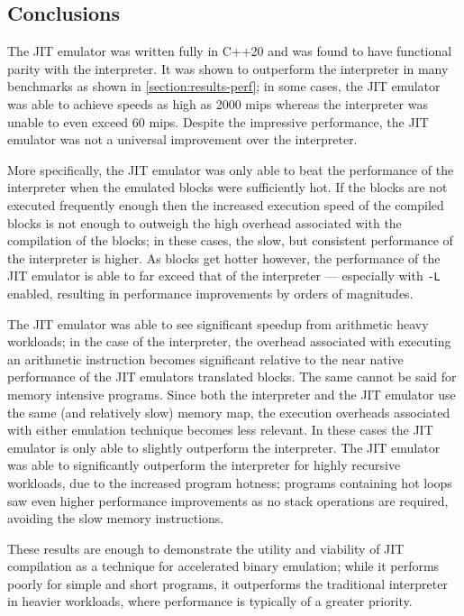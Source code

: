 \subsection{Conclusions}

The JIT emulator was written fully in C++20 and was found to have functional parity with the interpreter. It was shown to outperform the interpreter in many benchmarks as shown in \autoref{section:results-perf}; in some cases, the JIT emulator was able to achieve speeds as high as 2000 mips whereas the interpreter was unable to even exceed 60 mips. Despite the impressive performance, the JIT emulator was not a universal improvement over the interpreter.

More specifically, the JIT emulator was only able to beat the performance of the interpreter when the emulated blocks were sufficiently hot. If the blocks are not executed frequently enough then the increased execution speed of the compiled blocks is not enough to outweigh the high overhead associated with the compilation of the blocks; in these cases, the slow, but consistent performance of the interpreter is higher. As blocks get hotter however, the performance of the JIT emulator is able to far exceed that of the interpreter — especially with \texttt{-L} enabled, resulting in performance improvements by orders of magnitudes.

The JIT emulator was able to see significant speedup from arithmetic heavy workloads; in the case of the interpreter, the overhead associated with executing an arithmetic instruction becomes significant relative to the near native performance of the JIT emulators translated blocks. The same cannot be said for memory intensive programs. Since both the interpreter and the JIT emulator use the same (and relatively slow) memory map, the execution overheads associated with either emulation technique becomes less relevant. In these cases the JIT emulator is only able to slightly outperform the interpreter. The JIT emulator was able to significantly outperform the interpreter for highly recursive workloads, due to the increased program hotness; programs containing hot loops saw even higher performance improvements as no stack operations are required, avoiding the slow memory instructions.

These results are enough to demonstrate the utility and viability of JIT compilation as a technique for accelerated binary emulation; while it performs poorly for simple and short programs, it outperforms the traditional interpreter in heavier workloads, where performance is typically of a greater priority.

